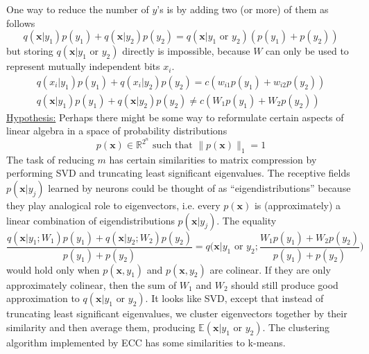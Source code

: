 \documentclass[12pt]{article}
\begin{document}
One way to reduce the number of $y$'s is by adding two (or more) of them as follows
\[
q(\boldsymbol{x}|y_1) p(y_1)+q(\boldsymbol{x}|y_2) p(y_2) = 
q(\boldsymbol{x}|y_1\text{ or }y_2) (p(y_1)+p(y_2))
\]
but storing $q(\boldsymbol{x}|y_1\text{ or }y_2)$ directly is impossible, because $W$ can only be used to represent mutually independent bits $x_i$. 
\begin{gather*}
	q(x_i|y_1) p(y_1)+q(x_i|y_2) p(y_2) = c(w_{i1}p(y_1) +w_{i2}p(y_2))  \\
	q(\boldsymbol{x}|y_1) p(y_1)+q(\boldsymbol{x}|y_2) p(y_2) \ne c(W_1p(y_1) +W_2p(y_2)) 
\end{gather*}
\underline{Hypothesis:} Perhaps there might be some way to reformulate certain aspects of linear algebra in a space of probability distributions 
\[p(\boldsymbol{x})\in \mathbb{R}^{2^n} \text{ such that } \lVert p(\boldsymbol{x}) \rVert_1=1\]
The task of reducing $m$ has certain similarities to matrix compression by performing SVD and truncating least significant eigenvalues. The receptive fields $p(\boldsymbol{x}|y_j)$ learned by neurons could be thought of as ``eigendistributions'' because they play analogical role to eigenvectors, i.e. every $p(\boldsymbol{x})$ is (approximately) a linear combination of eigendistributions $p(\boldsymbol{x}|y_j)$. The equality 
\[
\frac{q(\boldsymbol{x}|y_1;W_1) p(y_1)+q(\boldsymbol{x}|y_2;W_2) p(y_2)}{p(y_1)+p(y_2)} = 
q\big(\boldsymbol{x}|y_1\text{ or }y_2;\frac{W_1p(y_1) +W_2p(y_2)}{p(y_1)+p(y_2)}\big) 
\]
would hold only when $p(\boldsymbol{x},y_1)$ and $p(\boldsymbol{x},y_2)$ are colinear. If they are only approximately colinear, then the sum of $W_1$ and $W_2$ should still produce good approximation to $q(\boldsymbol{x}|y_1\text{ or }y_2)$. It looks like SVD, except that instead of truncating least significant eigenvalues, we cluster eigenvectors together by their similarity and then average them, producing $\mathbb{E}(\boldsymbol{x}|y_1\text{ or }y_2)$. The clustering algorithm implemented by ECC has some similarities to k-means.
\end{document}
